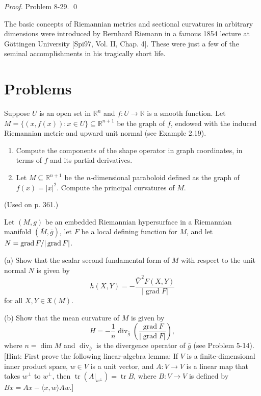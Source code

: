 \noindent\emph{Proof.} Problem 8-29. \qed

The basic concepts of Riemannian metrics and sectional curvatures in arbitrary dimensions were introduced by Bernhard Riemann in a famous 1854 lecture at Göttingen University [Spi97, Vol. II, Chap. 4]. These were just a few of the seminal accomplishments in his tragically short life.

\section{Problems}

\begin{exercise}
\label{prob:graph-submanifold-shape}
Suppose $U$ is an open set in $\mathbb{R}^n$ and $f: U \to \mathbb{R}$ is a smooth function. Let $M = \{(x, f(x)) : x \in U\} \subseteq \mathbb{R}^{n+1}$ be the graph of $f$, endowed with the induced Riemannian metric and upward unit normal (see Example 2.19).

\begin{enumerate}
\item[(a)] Compute the components of the shape operator in graph coordinates, in terms of $f$ and its partial derivatives.
\item[(b)] Let $M \subseteq \mathbb{R}^{n+1}$ be the $n$-dimensional paraboloid defined as the graph of $f(x) = |x|^2$. Compute the principal curvatures of $M$.
\end{enumerate}

(Used on p. 361.)
\end{exercise}

\begin{exercise}
\label{prob:hypersurface-defining-function}
Let $(M, g)$ be an embedded Riemannian hypersurface in a Riemannian manifold $(\bar{M}, \bar{g})$, let $F$ be a local defining function for $M$, and let $N = \operatorname{grad} F / |\operatorname{grad} F|$.

(a) Show that the scalar second fundamental form of $M$ with respect to the unit normal $N$ is given by
\[
h(X,Y) = -\frac{\bar{\nabla}^2 F(X,Y)}{|\operatorname{grad} F|}
\]
for all $X,Y \in \mathfrak{X}(M)$.

(b) Show that the mean curvature of $M$ is given by
\[
H = -\frac{1}{n} \operatorname{div}_{\bar{g}} \left( \frac{\operatorname{grad} F}{|\operatorname{grad} F|} \right),
\]
where $n = \dim M$ and $\operatorname{div}_{\bar{g}}$ is the divergence operator of $\bar{g}$ (see Problem 5-14). [Hint: First prove the following linear-algebra lemma: If $V$ is a finite-dimensional inner product space, $w \in V$ is a unit vector, and $A: V \to V$ is a linear map that takes $w^{\perp}$ to $w^{\perp}$, then $\operatorname{tr}(A|_{w^{\perp}}) = \operatorname{tr} B$, where $B: V \to V$ is defined by $Bx = Ax - \langle x, w \rangle Aw$.]
\end{exercise}

